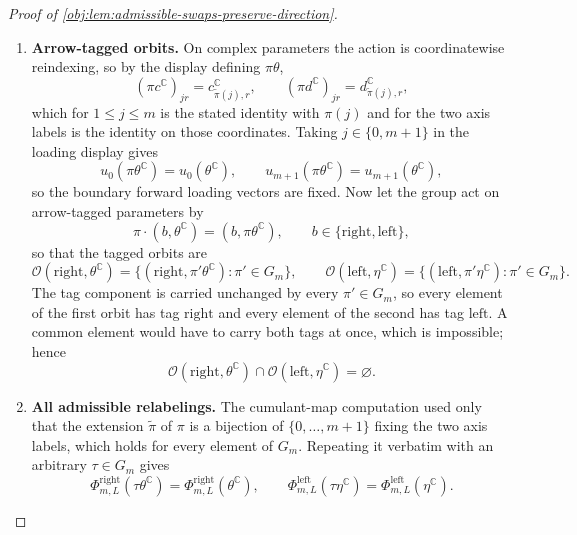 \begin{proof}[Proof of \cref{obj:lem:admissible-swaps-preserve-direction}]
\begin{enumerate}
\item \textbf{Arrow-tagged orbits.}  On complex parameters the action is coordinatewise reindexing, so by the display defining \(\pi\theta\),
\[
(\pi c^{\mathbb C})_{jr}=c^{\mathbb C}_{\tilde\pi(j),r},
\qquad
(\pi d^{\mathbb C})_{jr}=d^{\mathbb C}_{\tilde\pi(j),r},
\]
which for \(1\le j\le m\) is the stated identity with \(\pi(j)\) and for the two axis labels is the identity on those coordinates.  Taking \(j\in\{0,m+1\}\) in the loading display gives
\[
u_0(\pi\theta^{\mathbb C})=u_0(\theta^{\mathbb C}),
\qquad
u_{m+1}(\pi\theta^{\mathbb C})=u_{m+1}(\theta^{\mathbb C}),
\]
so the boundary forward loading vectors are fixed.  Now let the group act on arrow-tagged parameters by
\[
\pi\cdot(b,\theta^{\mathbb C})=(b,\pi\theta^{\mathbb C}),
\qquad b\in\{\mathrm{right},\mathrm{left}\},
\]
so that the tagged orbits are
\[
\mathcal O(\mathrm{right},\theta^{\mathbb C})
=\bigl\{(\mathrm{right},\pi'\theta^{\mathbb C}):\pi'\in G_m\bigr\},
\qquad
\mathcal O(\mathrm{left},\eta^{\mathbb C})
=\bigl\{(\mathrm{left},\pi'\eta^{\mathbb C}):\pi'\in G_m\bigr\}.
\]
The tag component is carried unchanged by every \(\pi'\in G_m\), so every element of the first orbit has tag \(\mathrm{right}\) and every element of the second has tag \(\mathrm{left}\).  A common element would have to carry both tags at once, which is impossible; hence
\[
\mathcal O(\mathrm{right},\theta^{\mathbb C})\cap\mathcal O(\mathrm{left},\eta^{\mathbb C})=\varnothing .
\]

\item \textbf{All admissible relabelings.}  The cumulant-map computation used only that the extension \(\tilde\pi\) of \(\pi\) is a bijection of \(\{0,\ldots,m+1\}\) fixing the two axis labels, which holds for every element of \(G_m\).  Repeating it verbatim with an arbitrary \(\tau\in G_m\) gives
\[
\Phi^{\mathrm{right}}_{m,L}(\tau\theta^{\mathbb C})
=\Phi^{\mathrm{right}}_{m,L}(\theta^{\mathbb C}),
\qquad
\Phi^{\mathrm{left}}_{m,L}(\tau\eta^{\mathbb C})
=\Phi^{\mathrm{left}}_{m,L}(\eta^{\mathbb C}).
\]
\end{enumerate}
\end{proof}
